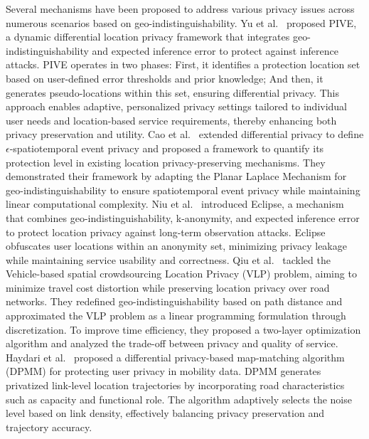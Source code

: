 Several mechanisms have been proposed to address various privacy issues across numerous scenarios based on geo-indistinguishability.  
Yu et al.~\cite{yu2017dynamic} proposed PIVE, a dynamic differential location privacy framework that integrates geo-indistinguishability and expected inference error to protect against inference attacks. PIVE operates in two phases: First, it identifies a protection location set based on user-defined error thresholds and prior knowledge; And then, it generates pseudo-locations within this set, ensuring differential privacy. This approach enables adaptive, personalized privacy settings tailored to individual user needs and location-based service requirements, thereby enhancing both privacy preservation and utility.
Cao et al.~\cite{cao2019priste} extended differential privacy to define $\epsilon$-spatiotemporal event privacy and proposed a framework to quantify its protection level in existing location privacy-preserving mechanisms. They demonstrated their framework by adapting the Planar Laplace Mechanism for geo-indistinguishability to ensure spatiotemporal event privacy while maintaining linear computational complexity.
Niu et al.~\cite{niu2020eclipse} introduced Eclipse, a mechanism that combines geo-indistinguishability, k-anonymity, and expected inference error to protect location privacy against long-term observation attacks. Eclipse obfuscates user locations within an anonymity set, minimizing privacy leakage while maintaining service usability and correctness.
Qiu et al.~\cite{qiu2020location}  tackled the Vehicle-based spatial crowdsourcing Location Privacy (VLP) problem, aiming to minimize travel cost distortion while preserving location privacy over road networks. They redefined geo-indistinguishability based on path distance and approximated the VLP problem as a linear programming formulation through discretization. To improve time efficiency, they proposed a two-layer optimization algorithm and analyzed the trade-off between privacy and quality of service.
Haydari et al.~\cite{haydari2022differentially} proposed a differential privacy-based map-matching algorithm (DPMM) for protecting user privacy in mobility data. DPMM generates privatized link-level location trajectories by incorporating road characteristics such as capacity and functional role. The algorithm adaptively selects the noise level based on link density, effectively balancing privacy preservation and trajectory accuracy.



